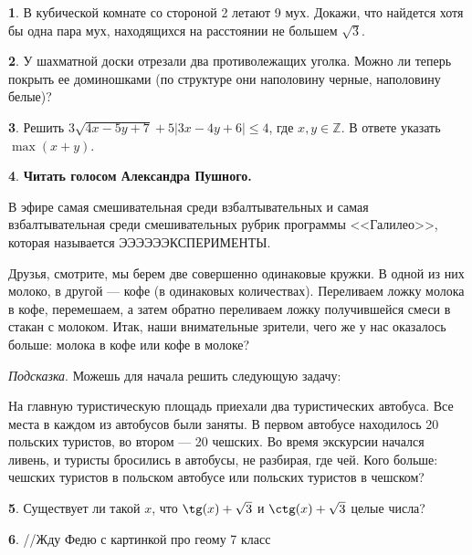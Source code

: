\documentclass[14pt, a4paper]{extarticle}
\theoremstyle{definition}
\newtheorem{problem}{}
\theoremstyle{definition}
\theoremstyle{remark}
\numberwithin{equation}{section}
\newcommand{\Z}{\ensuremath{\mathbb{Z}}}
\begin{document}
\begin{problem}
    В кубической комнате со стороной 2 летают 9 мух. 
    Докажи, что найдется хотя бы одна пара мух, 
    находящихся на расстоянии не большем $\sqrt{3}$.
\end{problem}

\begin{problem}
    У шахматной доски отрезали два противолежащих уголка.
    Можно ли теперь покрыть ее доминошками (по структуре они
    наполовину черные, наполовину белые)?
\end{problem}

\begin{problem}
    Решить $3\sqrt{4x - 5y + 7} +
    5|3x - 4y + 6| \leqslant 4$, где $x, y \in \Z$.
    В ответе указать $\max(x+y)$.
\end{problem}

\begin{problem}
    \textbf{Читать голосом Александра Пушного.}

    В эфире самая смешивательная среди взбалтывательных и самая
    взбалтывательная среди смешивательных рубрик программы <<Галилео>>, 
    которая называется ЭЭЭЭЭЭКСПЕРИМЕНТЫ.
    
    Друзья, смотрите, мы берем две совершенно одинаковые кружки.
    В одной из них молоко, в другой --- кофе (в одинаковых количествах). 
    Переливаем ложку молока в кофе, перемешаем, 
    а затем обратно переливаем ложку получившейся смеси в стакан с молоком. 
    Итак, наши внимательные зрители, чего же у нас оказалось больше:
    молока в кофе или кофе в молоке?

    \textit{Подсказка}. Можешь для начала решить следующую задачу:

    На главную туристическую площадь приехали два туристических 
    автобуса. Все места в каждом из автобусов были заняты. 
    В первом автобусе находилось 20 польских 
    туристов, во втором --- 20 чешских. Во время экскурсии 
    начался ливень, и туристы бросились в автобусы, не разбирая, где чей. 
    Кого больше: чешских туристов в польском автобусе или польских 
    туристов в чешском?
\end{problem}

\begin{problem}
    Существует ли такой $x$, что $\tg(x) + \sqrt{3}$ и 
    $\ctg(x) + \sqrt{3}$ целые числа?
\end{problem}

\begin{problem}
    //Жду Федю с картинкой про геому 7 класс
\end{problem}
\end{document}
